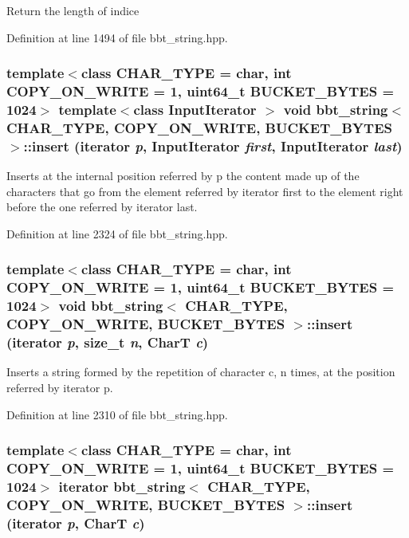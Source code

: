 Return the length of indice 

Definition at line 1494 of file bbt\_\-string.hpp.\hypertarget{classbbt__string_2720a0dd9a3b40ba8bda86d62a71c3c9}{
\subsubsection[{insert}]{\setlength{\rightskip}{0pt plus 5cm}template$<$class CHAR\_\-TYPE  = char, int COPY\_\-ON\_\-WRITE = 1, uint64\_\-t BUCKET\_\-BYTES = 1024$>$ template$<$class InputIterator $>$ void {\bf bbt\_\-string}$<$ CHAR\_\-TYPE, COPY\_\-ON\_\-WRITE, BUCKET\_\-BYTES $>$::insert (iterator {\em p}, \/  InputIterator {\em first}, \/  InputIterator {\em last})}}
\label{classbbt__string_2720a0dd9a3b40ba8bda86d62a71c3c9}


Inserts at the internal position referred by p the content made up of the characters that go from the element referred by iterator first to the element right before the one referred by iterator last. 

Definition at line 2324 of file bbt\_\-string.hpp.\hypertarget{classbbt__string_94e32cc061b77d94d5ccdd33375ac649}{
\subsubsection[{insert}]{\setlength{\rightskip}{0pt plus 5cm}template$<$class CHAR\_\-TYPE  = char, int COPY\_\-ON\_\-WRITE = 1, uint64\_\-t BUCKET\_\-BYTES = 1024$>$ void {\bf bbt\_\-string}$<$ CHAR\_\-TYPE, COPY\_\-ON\_\-WRITE, BUCKET\_\-BYTES $>$::insert (iterator {\em p}, \/  size\_\-t {\em n}, \/  CharT {\em c})}}
\label{classbbt__string_94e32cc061b77d94d5ccdd33375ac649}


Inserts a string formed by the repetition of character c, n times, at the position referred by iterator p. 

Definition at line 2310 of file bbt\_\-string.hpp.\hypertarget{classbbt__string_5eb3ddd3247398965c17324150398664}{
\subsubsection[{insert}]{\setlength{\rightskip}{0pt plus 5cm}template$<$class CHAR\_\-TYPE  = char, int COPY\_\-ON\_\-WRITE = 1, uint64\_\-t BUCKET\_\-BYTES = 1024$>$ iterator {\bf bbt\_\-string}$<$ CHAR\_\-TYPE, COPY\_\-ON\_\-WRITE, BUCKET\_\-BYTES $>$::insert (iterator {\em p}, \/  CharT {\em c})}}
\label{classbbt__string_5eb3ddd3247398965c17324150398664}


